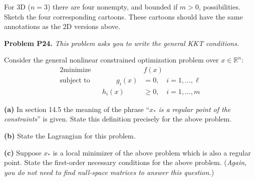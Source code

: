 \documentclass[12pt]{amsart}
\newcommand{\RR}{\mathbb{R}}
\newcommand{\prob}[1]{\bigskip\noindent\textbf{#1}\quad }
\newcommand{\epart}[1]{\medskip\noindent\textbf{(#1)}\quad }
\begin{document}
\bigskip
For 3D ($n=3$) there are four nonempty, and bounded if $m>0$, possibilities.  Sketch the four corresponding cartoons.  These cartoons should have the same annotations as the 2D versions above.


\medskip
\prob{Problem P24.}  \emph{This problem asks you to write the general KKT conditions.}

\medskip
Consider the general nonlinear constrained optimization problem over $x\in\RR^n$:
\begin{alignat*}{2}
    \text{minimize}   &&  &f(x) \\
    \text{subject to} && \qquad g_i(x) &= 0, \quad i=1,\dots,\ell \\
                      &&       h_i(x) &\ge 0, \quad i=1,\dots,m
\end{alignat*}

\epart{a}  In section 14.5 the meaning of the phrase ``$x_*$ \emph{is a regular point of the constraints}'' is given.  State this definition precisely for the above problem.

\epart{b}  State the Lagrangian for this problem.

\epart{c}  Suppose $x_*$ is a local minimizer of the above problem which is also a regular point.  State the first-order necessary conditions for the above problem.  (\emph{Again, you do \emph{not} need to find null-space matrices to answer this question.})
\end{document}
